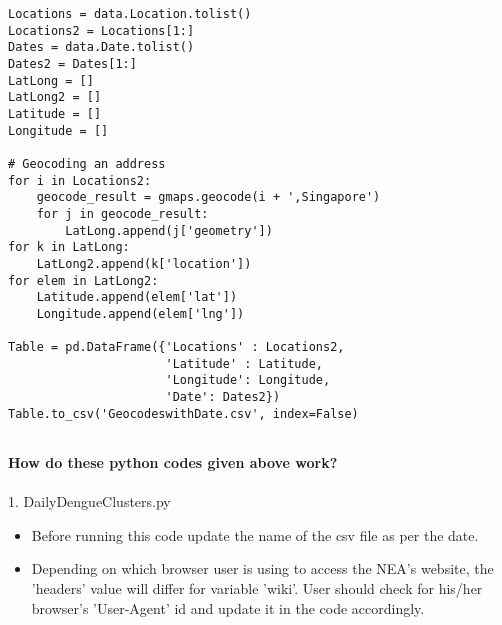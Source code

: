 \documentclass[11pt]{exam}
\begin{document}
\begin{questions}
\begin{lstlisting}
Locations = data.Location.tolist()
Locations2 = Locations[1:]
Dates = data.Date.tolist()
Dates2 = Dates[1:]
LatLong = []
LatLong2 = []
Latitude = []
Longitude = []

# Geocoding an address
for i in Locations2:
    geocode_result = gmaps.geocode(i + ',Singapore')
    for j in geocode_result:
        LatLong.append(j['geometry'])
for k in LatLong:
    LatLong2.append(k['location'])
for elem in LatLong2:
    Latitude.append(elem['lat'])
    Longitude.append(elem['lng'])

Table = pd.DataFrame({'Locations' : Locations2,
                      'Latitude' : Latitude,
                      'Longitude': Longitude,
                      'Date': Dates2})
Table.to_csv('GeocodeswithDate.csv', index=False)


\end{lstlisting}

\newpage
\color{black}
\textbf{How do these python codes given above work?}\\ \\
1. DailyDengueClusters.py \\
\begin{itemize}
\item Before running this code update the name of the csv file as per the date.\\
\item Depending on which browser user is using to access the NEA's website, the 'headers' value will differ for variable 'wiki'. User should check for his/her browser's 'User-Agent' id and update it in the code accordingly.\\
\end{itemize} 


\end{questions}
\end{document}
